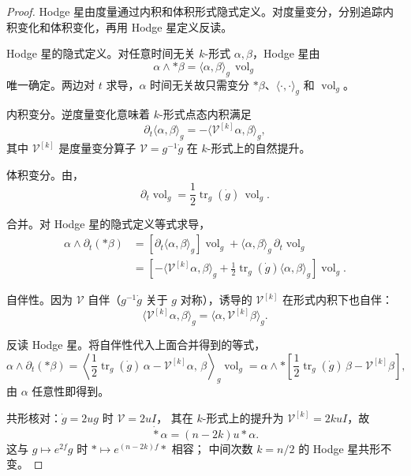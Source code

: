 \begin{proof}
Hodge 星由度量通过内积和体积形式隐式定义。对度量变分，分别追踪内积变化和体积变化，再用 Hodge 星定义反读。

Hodge 星的隐式定义。对任意时间无关 $k$-形式 $\alpha,\beta$，Hodge 星由
\begin{equation*}
 \alpha\wedge *\beta
 =\langle\alpha,\beta\rangle_g\,\operatorname{vol}_g
\end{equation*}
唯一确定。两边对 $t$ 求导，$\alpha$ 时间无关故只需变分 $*\beta$、$\langle\cdot,\cdot\rangle_g$ 和 $\operatorname{vol}_g$。

内积变分。逆度量变化意味着 $k$-形式点态内积满足
\begin{equation*}
 \partial_t\langle\alpha,\beta\rangle_g
 =-\langle \mathcal V^{[k]}\alpha,\beta\rangle_g,
\end{equation*}
其中 $\mathcal V^{[k]}$ 是度量变分算子 $\mathcal V=g^{-1}\dot g$ 在 $k$-形式上的自然提升。

体积变分。由，
\begin{equation*}
 \partial_t\operatorname{vol}_g
 =\frac{1}{2}\operatorname{tr}_g(\dot g)\,\operatorname{vol}_g.
\end{equation*}

合并。对 Hodge 星的隐式定义等式求导，
\begin{align*}
 \alpha\wedge\partial_t(*\beta)
 &=\left[\partial_t\langle\alpha,\beta\rangle_g\right]\operatorname{vol}_g
  +\langle\alpha,\beta\rangle_g\,\partial_t\operatorname{vol}_g\\
 &=\left[
  -\langle \mathcal V^{[k]}\alpha,\beta\rangle_g
  +\frac{1}{2}\operatorname{tr}_g(\dot g)
  \langle\alpha,\beta\rangle_g
 \right]\operatorname{vol}_g.
\end{align*}

自伴性。因为 $\mathcal V$ 自伴（$g^{-1}\dot g$ 关于 $g$ 对称），诱导的 $\mathcal V^{[k]}$ 在形式内积下也自伴：
\begin{equation*}
 \langle \mathcal V^{[k]}\alpha,\beta\rangle_g
 =\langle\alpha,\mathcal V^{[k]}\beta\rangle_g.
\end{equation*}

反读 Hodge 星。将自伴性代入上面合并得到的等式，
\begin{equation*}
 \alpha\wedge\partial_t(*\beta)
 =\left\langle
  \frac{1}{2}\operatorname{tr}_g(\dot g)\,\alpha
  -\mathcal V^{[k]}\alpha,\,
  \beta
 \right\rangle_g\operatorname{vol}_g
 =\alpha\wedge *\left[
  \frac{1}{2}\operatorname{tr}_g(\dot g)\,\beta
  -\mathcal V^{[k]}\beta
 \right],
\end{equation*}
由 $\alpha$ 任意性即得到。

共形核对：$\dot g=2ug$ 时 $\mathcal V=2uI$，
其在 $k$-形式上的提升为 $\mathcal V^{[k]}=2kuI$，故
\[
\dot *\alpha=(n-2k)u*\alpha.
\]
这与 $g\mapsto e^{2f}g$ 时 $*\mapsto e^{(n-2k)f}*$ 相容；
中间次数 $k=n/2$ 的 Hodge 星共形不变。
\end{proof}

